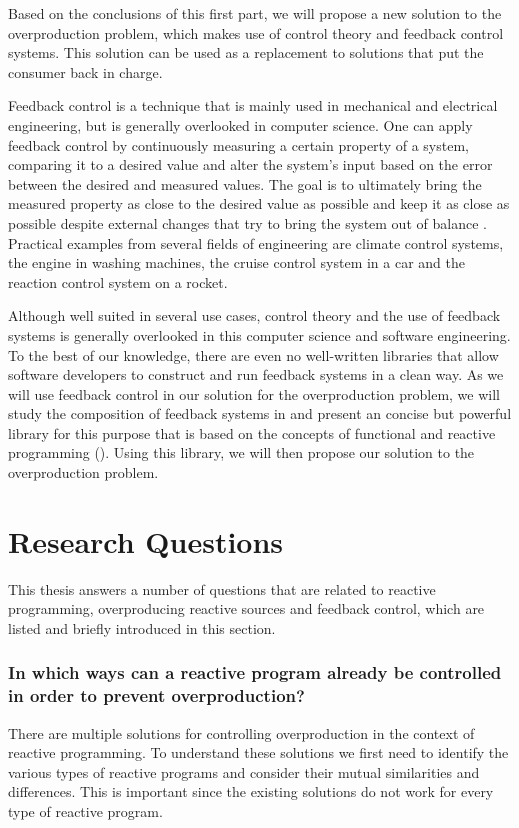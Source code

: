 Based on the conclusions of this first part, we will propose a new solution to the overproduction problem, which makes use of control theory and feedback control systems. This solution can be used as a replacement to solutions that put the consumer back in charge.

Feedback control is a technique that is mainly used in mechanical and electrical engineering, but is generally overlooked in computer science. One can apply feedback control by continuously measuring a certain property of a system, comparing it to a desired value and alter the system's input based on the error between the desired and measured values. The goal is to ultimately bring the measured property as close to the desired value as possible and keep it as close as possible despite external changes that try to bring the system out of balance \cite{janert2013-feedback}. Practical examples from several fields of engineering are climate control systems, the engine in washing machines, the cruise control system in a car and the reaction control system on a rocket.

Although well suited in several use cases, control theory and the use of feedback systems is generally overlooked in this computer science and software engineering. To the best of our knowledge, there are even no well-written libraries that allow software developers to construct and run feedback systems in a clean way. As we will use feedback control in our solution for the overproduction problem, we will study the composition of feedback systems in  and present an concise but powerful library for this purpose that is based on the concepts of functional and reactive programming (). Using this library, we will then propose our solution to the overproduction problem.

\section*{Research Questions}
This thesis answers a number of questions that are related to reactive programming, overproducing reactive sources and feedback control, which are listed and briefly introduced in this section.

\subsubsection*{In which ways can a reactive program already be controlled in order to prevent overproduction?}
There are multiple solutions for controlling overproduction in the context of reactive programming. To understand these solutions we first need to identify the various types of reactive programs and consider their mutual similarities and differences. This is important since the existing solutions do not work for every type of reactive program.

